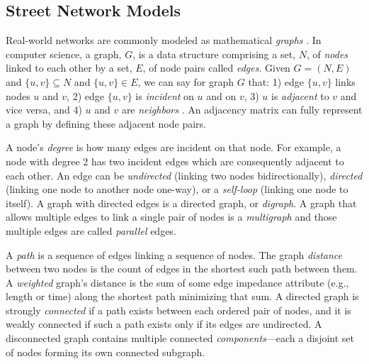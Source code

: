 \documentclass[12pt,letterpaper]{article} %
\begin{document}
\subsection{Street Network Models}

Real-world networks are commonly modeled as mathematical \textit{graphs} \citep{trudeau_introduction_1994}. In computer science, a graph, $G$, is a data structure comprising a set, $N$, of \textit{nodes} linked to each other by a set, $E$, of node pairs called \textit{edges}. Given $G = (N, E)$ and $\{u, v\} \subseteq N$ and $\{u, v\} \in E$, we can say for graph $G$ that: 1) edge $\{u, v\}$ links nodes $u$ and $v$, 2) edge $\{u, v\}$ is \textit{incident} on $u$ and on $v$, 3) $u$ is \textit{adjacent} to $v$ and vice versa, and 4) $u$ and $v$ are \textit{neighbors} \citep{newman_networks:_2010}. An adjacency matrix can fully represent a graph by defining these adjacent node pairs.

A node's \textit{degree} is how many edges are incident on that node. For example, a node with degree 2 has two incident edges which are consequently adjacent to each other. An edge can be \textit{undirected} (linking two nodes bidirectionally), \textit{directed} (linking one node to another node one-way), or a \textit{self-loop} (linking one node to itself). A graph with directed edges is a directed graph, or \textit{digraph}. A graph that allows multiple edges to link a single pair of nodes is a \textit{multigraph} and those multiple edges are called \textit{parallel} edges.

A \textit{path} is a sequence of edges linking a sequence of nodes. The graph \textit{distance} between two nodes is the count of edges in the shortest such path between them. A \textit{weighted} graph's distance is the sum of some edge impedance attribute (e.g., length or time) along the shortest path minimizing that sum. A directed graph is strongly \textit{connected} if a path exists between each ordered pair of nodes, and it is weakly connected if such a path exists only if its edges are undirected. A disconnected graph contains multiple connected \textit{components}---each a disjoint set of nodes forming its own connected subgraph.
\end{document}
